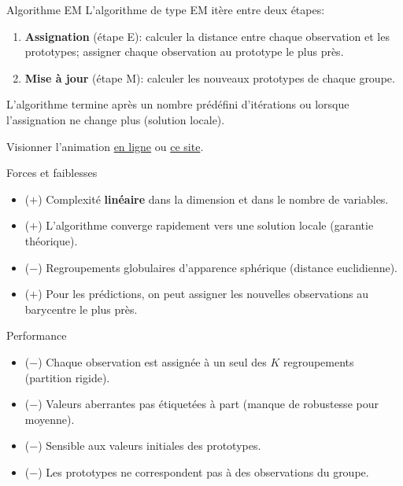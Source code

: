 \documentclass[
  ignorenonframetext,
]{beamer}
\providecommand{\tightlist}{%
  \setlength{\itemsep}{0pt}\setlength{\parskip}{0pt}}\usepackage{longtable,booktabs,array}
\begin{document}
\begin{frame}{Algorithme EM}
\protect\hypertarget{algorithme-em}{}
L'algorithme de type EM itère entre deux étapes:

\begin{enumerate}
\tightlist
\item
  \textbf{Assignation} (étape E): calculer la distance entre chaque
  observation et les prototypes; assigner chaque observation au
  prototype le plus près.
\item
  \textbf{Mise à jour} (étape M): calculer les nouveaux prototypes de
  chaque groupe.
\end{enumerate}

L'algorithme termine après un nombre prédéfini d'itérations ou lorsque
l'assignation ne change plus (solution locale).

Visionner l'animation
\href{https://lbelzile.github.io/math60602/03-regroupements_files/figure-html/fig-kmoy-animation-.gif}{en
ligne} ou
\href{https://www.naftaliharris.com/blog/visualizing-k-means-clustering/}{ce
site}.
\end{frame}

\begin{frame}{Forces et faiblesses}
\protect\hypertarget{forces-et-faiblesses}{}
\begin{itemize}
\tightlist
\item
  (\(+\)) Complexité \textbf{linéaire} dans la dimension et dans le
  nombre de variables.
\item
  (\(+\)) L'algorithme converge rapidement vers une solution locale
  (garantie théorique).
\item
  (\(-\)) Regroupements globulaires d'apparence sphérique (distance
  euclidienne).
\item
  (\(+\)) Pour les prédictions, on peut assigner les nouvelles
  observations au barycentre le plus près.
\end{itemize}
\end{frame}

\begin{frame}{Performance}
\protect\hypertarget{performance}{}
\begin{itemize}
\tightlist
\item
  (\(-\)) Chaque observation est assignée à un seul des \(K\)
  regroupements (partition rigide).
\item
  (\(-\)) Valeurs aberrantes pas étiquetées à part (manque de robustesse
  pour moyenne).
\item
  (\(-\)) Sensible aux valeurs initiales des prototypes.
\item
  (\(-\)) Les prototypes ne correspondent pas à des observations du
  groupe.
\end{itemize}
\end{frame}
\end{document}
